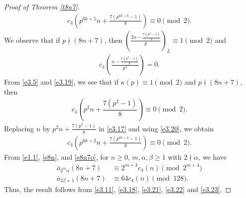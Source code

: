 \documentclass[11pt,a4paper]{article}
\numberwithin{equation}{section}
\theoremstyle{plain}
\begin{document}
\begin{proof}[Proof of Theorem \ref{t8n7}\unskip]
		\begin{align}\label{e3.18}
			c_4\displaystyle\left(p^{6k+5}n+\frac{7(p^{6k+6}-1)}{8}\right)\equiv0\pmod 2.
		\end{align}
		We observe that if $p\nmid (8n+7)$, then $\displaystyle\left(\frac{2n-\frac{7(p^2-1)}{4}}{p}\right)_L\equiv1\pmod 2$ and
		\begin{align}\label{e3.19}
			c_4\displaystyle\left(\frac{n-\frac{7(p^2-1)}{8}}{p^2}\right)=0.
		\end{align}
		From \eqref{e3.5} and \eqref{e3.19}, we see that if $\kappa(p)\equiv 1\pmod 2$ and $p\nmid(8n+7)$, then
		\begin{align}\label{e3.20}
			c_4\displaystyle\left(p^2n+\dfrac{7(p^2-1)}{8}\right)\equiv0\pmod2.
		\end{align}
		Replacing $n$ by $p^2n+\frac{7(p^4-1)}{8}$ in \eqref{e3.17} and using \eqref{e3.20}, we obtain
		\begin{align}\label{e3.21}
			c_4\displaystyle\left(p^{6k+2}n+\frac{7(p^{6k+2}-1)}{8}\right)\equiv0\pmod 2.
		\end{align}
		From \eqref{e1.1}, \eqref{e8n}, and \eqref{e8n7o}, for $n\ge 0$, $m,\alpha,\beta\ge 1$ with $2\nmid \alpha$, we have
		\begin{align}
			\bar{a}_{2^m\alpha}(8n+7)&\equiv 2^{m+3}c_4(n)\pmod{2^{m+4}}\label{e3.22}\\
			\bar{a}_{2\beta+1}(8n+7)&\equiv 64c_4(n)\pmod{128}.\label{e3.23}
		\end{align}
		Thus, the result follows from \eqref{e3.11}, \eqref{e3.18}, \eqref{e3.21}, \eqref{e3.22} and \eqref{e3.23}.
	\end{proof}
\end{document}
